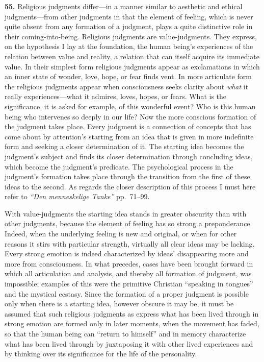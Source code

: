 \documentclass[12pt,a4paper]{book}
\newcommand{\opage}[1]{\marginnote{\footnotesize\textit{[#1]}}}
\begin{document}
\noindent\textbf{55.} Religious judgments differ---in a manner similar to aesthetic and
ethical judgments---from other judgments in that the element of feeling, which is never
quite absent from any formation of a judgment, plays a quite distinctive role in their
coming-into-being. Religious judgments are value-judgments. They express, on the
hypothesis I lay at the foundation, the human being's experiences of the relation between
value and reality, a relation that can itself acquire its immediate value. In their
simplest form religious judgments appear as exclamations in which an inner state of wonder,
love, hope, or fear finds vent. In more articulate form the religious judgments appear when
consciousness seeks clarity about \emph{what} it really experiences---what it admires,
loves, hopes, or fears. What is the significance, it is asked for example, of this wonderful
event? Who is this human being who intervenes so deeply in our life? Now the more 
\opage{123}conscious
formation of the judgment takes place. Every judgment is a connection of concepts that has
come about by attention's starting from an idea that is given in more indefinite form and
seeking a closer determination of it. The starting idea becomes the judgment's subject and
finds its closer determination through concluding ideas, which become the judgment's
predicate. The psychological process in the judgment's formation takes place through the
transition from the first of these ideas to the second. As regards the closer description of
this process I must here refer to \emph{``Den menneskelige Tanke''} pp.~71--99.

With value-judgments the starting idea stands in greater obscurity than with other judgments,
because the element of feeling has so strong a preponderance. Indeed, when the underlying
feeling is new and original, or when for other reasons it stirs with particular strength,
virtually all clear ideas may be lacking. Every strong emotion is indeed characterized by
ideas' disappearing more and more from consciousness. In what precedes, cases have been
brought forward in which all articulation and analysis, and thereby all formation of
judgment, was impossible; examples of this were the primitive Christian ``speaking in
tongues'' and the mystical ecstasy. Since the formation of a proper judgment is possible only
when there is a starting idea, however obscure it may be, it must be assumed that such
religious judgments as express what has been lived through in strong emotion are formed only
in later moments, when the movement has faded, so that the human being can ``return to
himself'' and in memory characterize what has been lived through by juxtaposing it with other
lived experiences and by thinking over its significance for the life of the personality.
\end{document}
